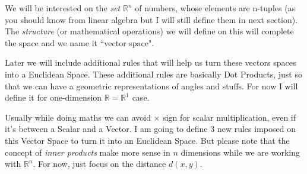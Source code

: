 \documentclass[letter]{article}
\begin{document}
\textsf{We will be interested on the \emph{set} $\mathbb{R}^{n}$ of numbers, whose elements are n-tuples (as you should know from linear algebra but I will still define them in next section). The \emph{structure} (or mathematical operations) we will define on this will complete the space and we name it ``vector space". }

\textsf{Later we will include additional rules that will help us turn these vectors spaces into a Euclidean Space. These additional rules are basically Dot Products, just so that we can have a geometric representations of angles and stuffs. For now I will define it for one-dimension $\mathbb{R} = \mathbb{R}^{1}$ case. 
}




\textsf{Usually while doing maths we can avoid $\times $ sign for scalar multiplication, even if it's between a Scalar and a Vector. I am going to define 3 new rules imposed on this Vector Space to turn it into an Euclidean Space. But please note that the concept of \emph{inner products} make more sense in $n$ dimensions while we are working with $\mathbb{R}^{n}$. For now, just focus on the distance $d (x,y)$. }
\end{document}
